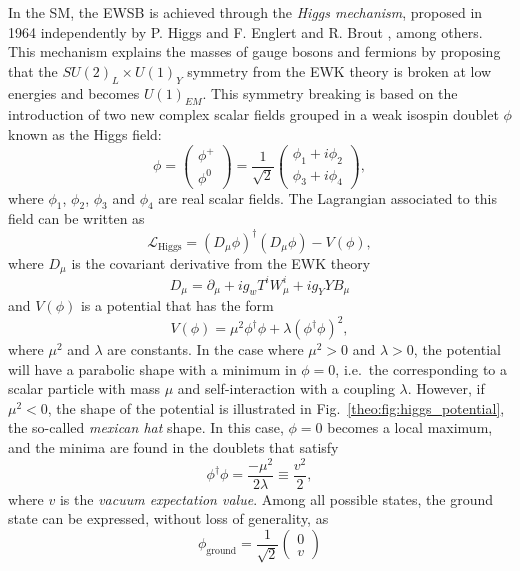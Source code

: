 \documentclass[../main.tex]{subfiles}
\begin{document}
In the SM, the EWSB is achieved through the \textit{Higgs mechanism}, proposed in 1964 independently by P. Higgs \cite{intro:theo:peter_higgs} and F. Englert and R. Brout \cite{intro:theo:englert_brout}, among others. This mechanism explains the masses of gauge bosons and fermions by proposing that the $SU(2)_L\times U(1)_Y$ symmetry from the EWK theory is broken at low energies and becomes $U(1)_{EM}$. This symmetry breaking is based on the introduction of two new complex scalar fields grouped in a weak isospin doublet $\phi$ known as the Higgs field:
\begin{equation}
\phi = 
\left(
\begin{matrix}
\phi^+ \\
\phi^0
\end{matrix}
\right)
= 
\frac{1}{\sqrt{2}}
\left(
\begin{matrix}
\phi_1 + i\phi_2 \\
\phi_3 + i\phi_4 
\end{matrix}
\right),
\end{equation}
where $\phi_1$, $\phi_2$, $\phi_3$ and $\phi_4$ are real scalar fields. The Lagrangian associated to this field can be written as
\begin{equation}
\label{theo:eq:higgs_lagrangian}
\mathcal{L}_{\text{Higgs}} = (D_\mu\phi)^\dag (D_\mu\phi) - V(\phi),
\end{equation}
where $D_\mu$ is the covariant derivative from the EWK theory
\begin{equation}
D_\mu = \partial_\mu + ig_w T^i W_\mu^i + i g_Y Y B_\mu
\end{equation}
and $V(\phi)$ is a potential that has the form
\begin{equation}
V(\phi) = \mu^2\phi^\dag\phi + \lambda(\phi^\dagger\phi)^2,
\end{equation}
where $\mu^2$ and $\lambda$ are constants. In the case where $\mu^2>0$ and $\lambda>0$, the potential will have a parabolic shape with a minimum in $\phi=0$, i.e.~the corresponding to a scalar particle with mass $\mu$ and self-interaction with a coupling $\lambda$. However, if $\mu^2<0$, the shape of the potential is illustrated in Fig.~\ref{theo:fig:higgs_potential}, the so-called \textit{mexican hat} shape. In this case, $\phi=0$ becomes a local maximum, and the minima are found in the doublets that satisfy
\begin{equation}
\phi^\dagger\phi = \frac{-\mu^2}{2\lambda} \equiv \frac{v^2}{2},
\end{equation}
where $v$ is the \textit{vacuum expectation value}. Among all possible states, the ground state can be expressed, without loss of generality, as
\begin{equation}
\phi_\text{ground} = \frac{1}{\sqrt{2}}\left(
\begin{matrix}
0 \\
v
\end{matrix}
\right)
\end{equation}
\end{document}
